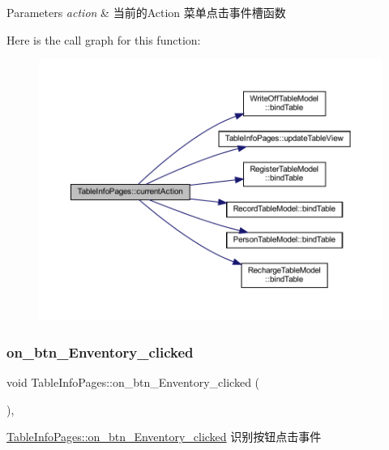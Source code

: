 \begin{DoxyParams}{Parameters}
{\em action} & 当前的\+Action 菜单点击事件槽函数 \\
\hline
\end{DoxyParams}
Here is the call graph for this function\+:
\nopagebreak
\begin{figure}[H]
\begin{center}
\leavevmode
\includegraphics[width=350pt]{class_table_info_pages_ad1da457e9ca5163f17d14035185457f7_cgraph}
\end{center}
\end{figure}
\mbox{\label{class_table_info_pages_aa65b69a9006eed0d90854eae510f2246}} 
\subsubsection{\texorpdfstring{on\_btn\_Enventory\_clicked}{on\_btn\_Enventory\_clicked}}
{\footnotesize\ttfamily void Table\+Info\+Pages\+::on\+\_\+btn\+\_\+\+Enventory\+\_\+clicked (\begin{DoxyParamCaption}{ }\end{DoxyParamCaption})\hspace{0.3cm}{\ttfamily [private]}, {\ttfamily [slot]}}



\mbox{\hyperlink{class_table_info_pages_aa65b69a9006eed0d90854eae510f2246}{Table\+Info\+Pages\+::on\+\_\+btn\+\_\+\+Enventory\+\_\+clicked}} 识别按钮点击事件 

